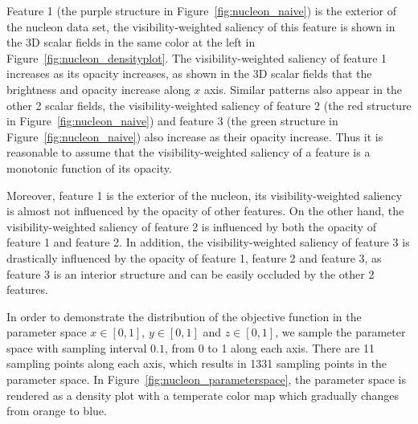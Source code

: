 Feature 1 (the purple structure in Figure~\ref{fig:nucleon_naive}) is the exterior of the nucleon data set, the visibility-weighted saliency of this feature is shown in the 3D scalar fields in the same color at the left in Figure~\ref{fig:nucleon_densityplot}.
The visibility-weighted saliency of feature 1 increases as its opacity increases, as shown in the 3D scalar fields that the brightness and opacity increase along $ x $ axis. Similar patterns also appear in the other 2 scalar fields, the visibility-weighted saliency of feature 2 (the red structure in Figure~\ref{fig:nucleon_naive}) and feature 3 (the green structure in Figure~\ref{fig:nucleon_naive}) also increase as their opacity increase.
Thus it is reasonable to assume that the visibility-weighted saliency of a feature is a monotonic function of its opacity.

Moreover, feature 1 is the exterior of the nucleon, its visibility-weighted saliency is almost not influenced by the opacity of other features. On the other hand, the visibility-weighted saliency of feature 2 is influenced by both the opacity of feature 1 and feature 2. In addition, the visibility-weighted saliency of feature 3 is drastically influenced by the opacity of feature 1, feature 2 and feature 3, as feature 3 is an interior structure and can be easily occluded by the other 2 features.

In order to demonstrate the distribution of the objective function in the parameter space $ x \in [0,1] $, $ y \in [0,1] $ and $ z \in [0,1] $, we sample the parameter space with sampling interval $ 0.1 $, from 0 to 1 along each axis. There are 11 sampling points along each axis, which results in 1331 sampling points in the parameter space. In Figure~\ref{fig:nucleon_parameterspace}, the parameter space is rendered as a density plot with a temperate color map which gradually changes from orange to blue.

